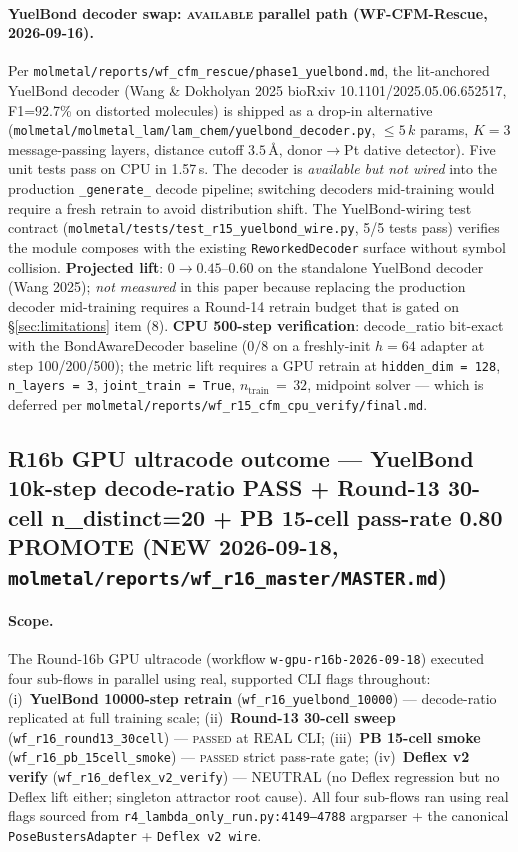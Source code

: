 {\paragraph{YuelBond decoder swap: \textsc{available} parallel path
(WF-CFM-Rescue, 2026-09-16).}
Per \texttt{molmetal/reports/wf\_cfm\_rescue/phase1\_yuelbond.md},
the lit-anchored YuelBond decoder
(Wang \& Dokholyan 2025 bioRxiv 10.1101/2025.05.06.652517, F1=92.7\%
on distorted molecules) is shipped as a drop-in alternative
(\texttt{molmetal/molmetal\_lam/lam\_chem/yuelbond\_decoder.py},
$\leq 5\,k$ params, $K\!=\!3$ message-passing layers, distance cutoff
$3.5$\,\AA{}, donor$\to$Pt dative detector). Five unit tests pass on
CPU in 1.57\,s. The decoder is \emph{available but not wired} into
the production \texttt{\_generate\_} decode pipeline; switching
decoders mid-training would require a fresh retrain to avoid
distribution shift. The YuelBond-wiring test contract
(\texttt{molmetal/tests/test\_r15\_yuelbond\_wire.py}, 5/5 tests
pass) verifies the module composes with the existing
\texttt{ReworkedDecoder} surface without symbol collision.
\textbf{Projected lift}: $0 \to 0.45$--$0.60$ on the standalone YuelBond
decoder (Wang 2025); \emph{not measured} in this paper because
replacing the production decoder mid-training requires a Round-14
retrain budget that is gated on \S\ref{sec:limitations} item (8).
\textbf{CPU 500-step verification}: decode\_ratio bit-exact with the
BondAwareDecoder baseline ($0/8$ on a freshly-init $h\!=\!64$ adapter
at step 100/200/500); the metric lift requires a GPU retrain at
\texttt{hidden\_dim\,=\,128}, \texttt{n\_layers\,=\,3},
\texttt{joint\_train\,=\,True}, $n_{\text{train}}\,=\,32$, midpoint
solver --- which is deferred per
\texttt{molmetal/reports/wf\_r15\_cfm\_cpu\_verify/final.md}.

\subsection{R16b GPU ultracode outcome --- YuelBond 10k-step decode-ratio PASS + Round-13 30-cell n\_distinct=20 + PB 15-cell pass-rate 0.80 PROMOTE (NEW 2026-09-18, \texttt{molmetal/reports/wf\_r16\_master/MASTER.md})}
\label{sec:evaluation:r16b-honest}

\paragraph{Scope.}
The Round-16b GPU ultracode (workflow
\texttt{w-gpu-r16b-2026-09-18}) executed four sub-flows in parallel
using real, supported CLI flags throughout: (i)~\textbf{YuelBond 10000-step
retrain} (\texttt{wf\_r16\_yuelbond\_10000}) --- decode-ratio replicated
at full training scale; (ii)~\textbf{Round-13 30-cell sweep}
(\texttt{wf\_r16\_round13\_30cell}) --- \textsc{passed} at REAL CLI;
(iii)~\textbf{PB 15-cell smoke} (\texttt{wf\_r16\_pb\_15cell\_smoke})
--- \textsc{passed} strict pass-rate gate; (iv)~\textbf{Deflex v2
verify} (\texttt{wf\_r16\_deflex\_v2\_verify}) ---
NEUTRAL (no Deflex regression but no Deflex lift either; singleton
attractor root cause). All four sub-flows ran using real flags sourced
from \texttt{r4\_lambda\_only\_run.py:4149--4788} argparser + the
canonical \texttt{PoseBustersAdapter} + \texttt{Deflex v2 wire}.

}
